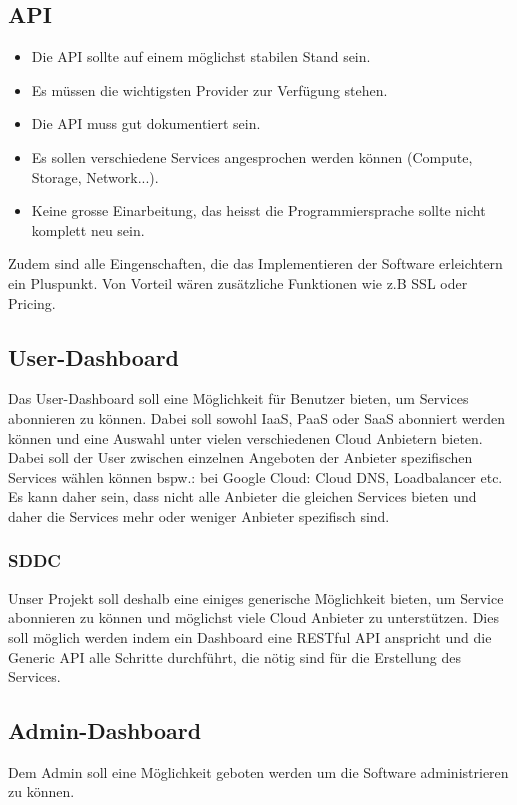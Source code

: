 

\subsection{API}
\begin{itemize}
\item Die API sollte auf einem möglichst stabilen Stand sein.
\item Es müssen die wichtigsten Provider zur Verfügung stehen.
\item Die API muss gut dokumentiert sein.
\item Es sollen verschiedene Services angesprochen werden können (Compute, Storage, Network...).
\item Keine grosse Einarbeitung, das heisst die Programmiersprache sollte nicht komplett neu sein.
\end{itemize}
Zudem sind alle Eingenschaften, die das Implementieren der Software erleichtern ein 
Pluspunkt. Von Vorteil wären zusätzliche Funktionen wie z.B SSL oder Pricing. 

\subsection{User-Dashboard}
Das User-Dashboard soll eine Möglichkeit für Benutzer bieten, um Services 
abonnieren zu können.
Dabei soll sowohl \ac{IaaS}, \ac{PaaS} oder \ac{SaaS} abonniert werden können und eine Auswahl 
 unter vielen verschiedenen Cloud Anbietern bieten.
Dabei soll der User zwischen einzelnen Angeboten der Anbieter spezifischen 
Services wählen können bspw.: bei Google Cloud: Cloud DNS, Loadbalancer etc.
Es kann daher sein, dass nicht alle Anbieter die gleichen Services bieten und 
daher die Services mehr oder weniger Anbieter spezifisch sind.

\subsubsection{SDDC}
Unser Projekt soll deshalb eine einiges generische Möglichkeit bieten, um 
Service abonnieren zu können und möglichst viele Cloud Anbieter zu 
unterstützen.
Dies soll möglich werden indem ein Dashboard eine RESTful API anspricht und 
die Generic API alle Schritte durchführt, die nötig sind für die Erstellung des 
Services.

\subsection{Admin-Dashboard}
Dem Admin soll eine Möglichkeit geboten werden um die Software administrieren zu 
können.
